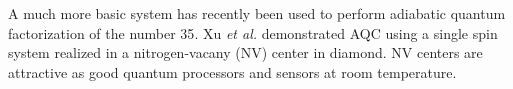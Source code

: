 \documentclass[%
 reprint,
 amsmath,amssymb,
 aps,
]{revtex4-1}
\begin{document}
   A much more basic system has recently been used to perform adiabatic quantum factorization of the number 35\cite{Xu2017}. Xu \textit{et al.} demonstrated AQC using a single spin system realized in a nitrogen-vacany (NV) center in diamond. NV centers are attractive as good quantum processors and sensors at room temperature\cite{DOHERTY20131}. 


\begin{comment}


\section{\label{sec:level1}First-level heading}

\subsection{\label{sec:level2}Second-level heading: Formatting}

\subsubsection{Wide text (A level-3 head)}

\subsection{\label{sec:citeref}Citations and References}

\subsubsection{Citations}

\paragraph{Syntax}

\end{comment}

\nocite{*} %
\end{document}

